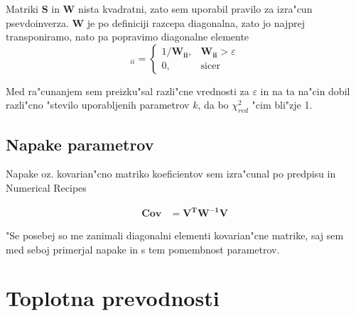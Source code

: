 \documentclass[a4paper,10pt]{article}
\begin{document}
Matriki $\mathbf{S}$ in $\mathbf{W}$ nista kvadratni, zato sem uporabil pravilo za izra"cun psevdoinverza. $\mathbf{W}$ je po definiciji razcepa diagonalna, zato jo najprej transponiramo, nato pa popravimo diagonalne elemente
\begin{equation}
 [\mathbf W^{-1}]_{ii} = \left\{ \begin{matrix}
                         1/\mathbf{W_{ii}}, & \mathbf{W_{ii}} > \varepsilon \\
			 0, & \mathrm{sicer}
                        \end{matrix} \right.
\end{equation}

Med ra"cunanjem sem preizku"sal razli"cne vrednosti za $\varepsilon$ in na ta na"cin dobil razli"cno "stevilo uporabljenih parametrov $k$, da bo $\chi^2_{red}$ "cim bli"zje 1.  

\subsection{Napake parametrov}

Napake oz. kovarian"cno matriko koeficientov sem izra"cunal po predpisu in Numerical Recipes

\begin{align}
 \mathbf{Cov} &= \mathbf{V^T W^{-1} V}
\end{align}

"Se posebej so me zanimali diagonalni elementi kovarian"cne matrike, saj sem med seboj primerjal napake in s tem pomembnost parametrov. 

\section{Toplotna prevodnosti}
\end{document}

